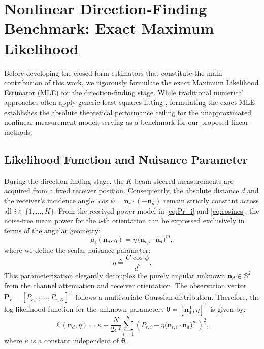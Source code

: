 \documentclass[journal]{IEEEtran}
\begin{document}
\section{Nonlinear Direction-Finding Benchmark: Exact Maximum Likelihood}
\label{sec:NoLineal}

Before developing the closed-form estimators that constitute the main contribution of this work, we rigorously formulate the exact Maximum Likelihood Estimator (MLE) for the direction-finding stage. While traditional numerical approaches often apply generic least-squares fitting \cite{Qin2020, Ma2024}, formulating the exact MLE establishes the absolute theoretical performance ceiling for the unapproximated nonlinear measurement model, serving as a benchmark for our proposed linear methods.

\subsection{Likelihood Function and Nuisance Parameter}

During the direction-finding stage, the $K$ beam-steered measurements are acquired from a fixed receiver position. Consequently, the absolute distance $d$ and the receiver's incidence angle $\cos\psi = \mathbf{n}_r \cdot (-\mathbf{n}_d)$ remain strictly constant across all $i \in \{1, \dots, K\}$. From the received power model in \eqref{eq:Pr_i} and \eqref{eq:cosines}, the noise-free mean power for the $i$-th orientation can be expressed exclusively in terms of the angular geometry:
\begin{equation}
    \mu_i(\mathbf{n}_d, \eta) = \eta\,\bigl(\mathbf{n}_{t,i}\cdot\mathbf{n}_d\bigr)^{m},
    \label{eq:mu_eta}
\end{equation}
where we define the scalar nuisance parameter:
\begin{equation}
    \eta \triangleq \frac{C\cos\psi}{d^{2}}.
    \label{eq:eta_def}
\end{equation}
This parameterization elegantly decouples the purely angular unknown $\mathbf{n}_d \in \mathbb{S}^{2}$ from the channel attenuation and receiver orientation. The observation vector $\mathbf{P}_r = [P_{r,1}, \dots, P_{r,K}]^{\mathsf{T}}$ follows a multivariate Gaussian distribution. Therefore, the log-likelihood function for the unknown parameters $\boldsymbol{\theta} = [\mathbf{n}_d^{\mathsf{T}}, \eta]^{\mathsf{T}}$ is given by:
\begin{equation}
    \ell(\mathbf{n}_d, \eta) = \kappa - \frac{N}{2\sigma^2} \sum_{i=1}^{K} \left( P_{r,i} - \eta \bigl(\mathbf{n}_{t,i}\cdot\mathbf{n}_d\bigr)^{m} \right)^2,
    \label{eq:log_likelihood}
\end{equation}
where $\kappa$ is a constant independent of $\boldsymbol{\theta}$.
\end{document}
